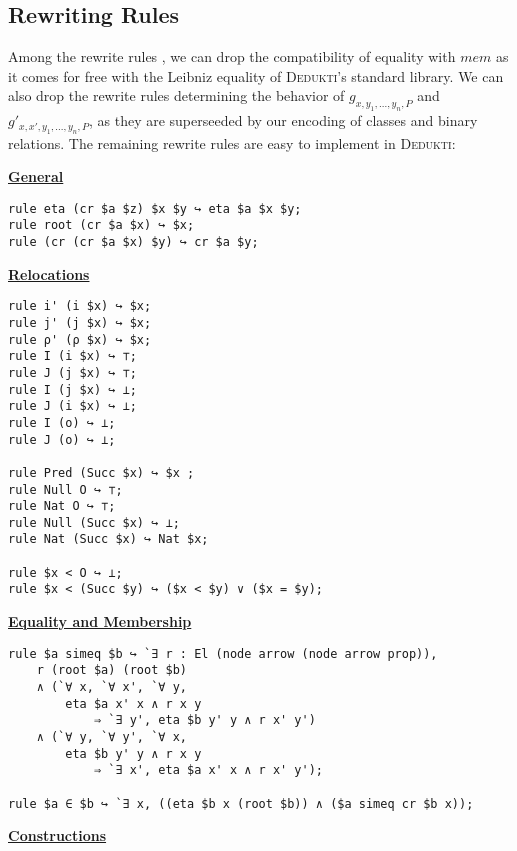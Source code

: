 \documentclass[submission,copyright,creativecommons]{eptcs}
\newcommand{\dedukti}{\textsc{Dedukti}}
\begin{document}
\subsection{Rewriting Rules}

Among the rewrite rules \cite[see Table 3]{zermodulo}, we can drop the compatibility of equality with $mem$ as it comes for free with the Leibniz equality of \dedukti's standard library. We can also drop the rewrite rules determining the behavior of $g_{x,y_1,...,y_n,P}$ and $g'_{x,x',y_1,...,y_n,P}$, as they are superseeded by our encoding of classes and binary relations. The remaining rewrite rules are easy to implement in \dedukti:
\filbreak
\begin{center}
\underline{\textbf{General}}
\end{center}
\begin{lstlisting}
rule eta (cr $a $z) $x $y ↪ eta $a $x $y;
rule root (cr $a $x) ↪ $x;
rule (cr (cr $a $x) $y) ↪ cr $a $y;
\end{lstlisting}
\filbreak
\begin{center}
\underline{\textbf{Relocations}}
\end{center}
\begin{lstlisting}
rule i' (i $x) ↪ $x;
rule j' (j $x) ↪ $x;
rule ρ' (ρ $x) ↪ $x;
rule I (i $x) ↪ ⊤;
rule J (j $x) ↪ ⊤;
rule I (j $x) ↪ ⊥;
rule J (i $x) ↪ ⊥;
rule I (o) ↪ ⊥;
rule J (o) ↪ ⊥;

rule Pred (Succ $x) ↪ $x ;
rule Null O ↪ ⊤;
rule Nat O ↪ ⊤;
rule Null (Succ $x) ↪ ⊥;
rule Nat (Succ $x) ↪ Nat $x;

rule $x < O ↪ ⊥;
rule $x < (Succ $y) ↪ ($x < $y) ∨ ($x = $y);
\end{lstlisting}
\filbreak
\begin{center}
\underline{\textbf{Equality and Membership}}
\end{center}
\begin{lstlisting}
rule $a simeq $b ↪ `∃ r : El (node arrow (node arrow prop)), 
    r (root $a) (root $b)
    ∧ (`∀ x, `∀ x', `∀ y, 
        eta $a x' x ∧ r x y
            ⇒ `∃ y', eta $b y' y ∧ r x' y')
    ∧ (`∀ y, `∀ y', `∀ x, 
        eta $b y' y ∧ r x y
            ⇒ `∃ x', eta $a x' x ∧ r x' y');

rule $a ∈ $b ↪ `∃ x, ((eta $b x (root $b)) ∧ ($a simeq cr $b x));
\end{lstlisting}
\filbreak
\begin{center}
\underline{\textbf{Constructions}}
\end{center}
\end{document}
